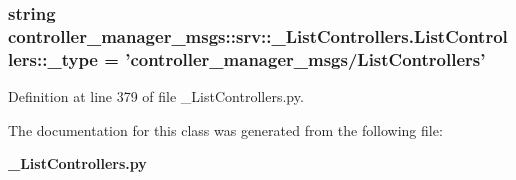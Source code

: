 \subsubsection[{\-\_\-type}]{\setlength{\rightskip}{0pt plus 5cm}string {\bf controller\-\_\-manager\-\_\-msgs\-::srv\-::\-\_\-\-List\-Controllers.\-List\-Controllers\-::\-\_\-type} = 'controller\-\_\-manager\-\_\-msgs/{\bf \-List\-Controllers}'\hspace{0.3cm}{\ttfamily  [static, private]}}\label{classcontroller__manager__msgs_1_1srv_1_1__ListControllers_1_1ListControllers_a461c57621ddcf06022c15f74b6f16a38}


\-Definition at line 379 of file \-\_\-\-List\-Controllers.\-py.



\-The documentation for this class was generated from the following file\-:\begin{DoxyCompactItemize}
\item 
{\bf \-\_\-\-List\-Controllers.\-py}\end{DoxyCompactItemize}
